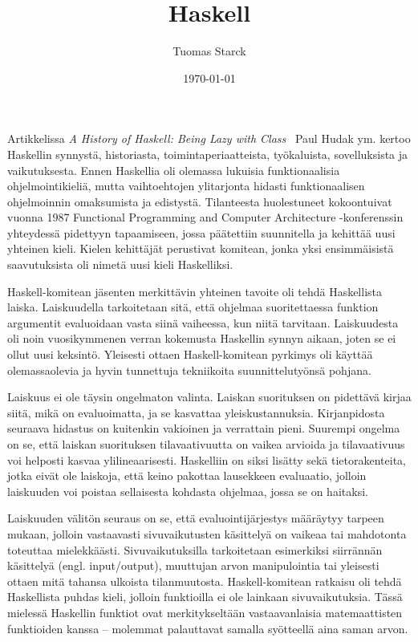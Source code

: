\documentclass[finnish]{tktltiki2}
\title{Haskell}
\author{Tuomas Starck}
\date{\today}
\begin{document}
\frontmatter

\maketitle
\makeabstract

\tableofcontents

\mainmatter

Artikkelissa \emph{A History of Haskell: Being Lazy with Class}~\cite{hoh07} Paul Hudak ym. kertoo Haskellin synnystä, historiasta, toimintaperiaatteista, työkaluista, sovelluksista ja vaikutuksesta. Ennen Haskellia oli olemassa lukuisia funktionaalisia ohjelmointikieliä, mutta vaihtoehtojen ylitarjonta hidasti funktionaalisen ohjelmoinnin omaksumista ja edistystä. Tilanteesta huolestuneet kokoontuivat vuonna 1987 Functional Programming and Computer Architecture -konferenssin yhteydessä pidettyyn tapaamiseen, jossa päätettiin suunnitella ja kehittää uusi yhteinen kieli. Kielen kehittäjät perustivat komitean, jonka yksi ensimmäisistä saavutuksista oli nimetä uusi kieli Haskelliksi.



Haskell-komitean jäsenten merkittävin yhteinen tavoite oli tehdä Haskellista laiska. Laiskuudella tarkoitetaan sitä, että ohjelmaa suoritettaessa funktion argumentit evaluoidaan vasta siinä vaiheessa, kun niitä tarvitaan. Laiskuudesta oli noin vuosikymmenen verran kokemusta Haskellin synnyn aikaan, joten se ei ollut uusi keksintö. Yleisesti ottaen Haskell-komitean pyrkimys oli käyttää olemassaolevia ja hyvin tunnettuja tekniikoita suunnittelutyönsä pohjana.

Laiskuus ei ole täysin ongelmaton valinta. Laiskan suorituksen on pidettävä kirjaa siitä, mikä on evaluoimatta, ja se kasvattaa yleiskustannuksia. Kirjanpidosta seuraava hidastus on kuitenkin vakioinen ja verrattain pieni. Suurempi ongelma on se, että laiskan suorituksen tilavaativuutta on vaikea arvioida ja tilavaativuus voi helposti kasvaa ylilineaarisesti. Haskelliin on siksi lisätty sekä tietorakenteita, jotka eivät ole laiskoja, että keino pakottaa lausekkeen evaluaatio, jolloin laiskuuden voi poistaa sellaisesta kohdasta ohjelmaa, jossa se on haitaksi.


Laiskuuden välitön seuraus on se, että evaluointijärjestys määräytyy tarpeen mukaan, jolloin vastaavasti sivuvaikutusten käsittelyä on vaikeaa tai mahdotonta toteuttaa mielekkäästi. Sivuvaikutuksilla tarkoitetaan esimerkiksi siirrännän käsittelyä (engl. input/output), muuttujan arvon manipulointia tai yleisesti ottaen mitä tahansa ulkoista tilanmuutosta. Haskell-komitean ratkaisu oli tehdä Haskellista puhdas kieli, jolloin funktioilla ei ole lainkaan sivuvaikutuksia. Tässä mielessä Haskellin funktiot ovat merkitykseltään vastaavanlaisia matemaattisten funktioiden kanssa -- molemmat palauttavat samalla syötteellä aina saman arvon.
\end{document}
